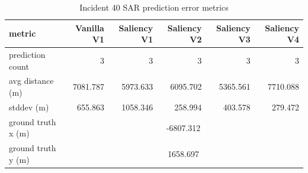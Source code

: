 \begin{table}[ht]
\centering
\caption{Incident 40 SAR prediction error metrics}
\label{tab:sar-incident-40}
\begin{tabular}{lrrrrr}
\hline
metric & Vanilla V1 & Saliency V1 & Saliency V2 & Saliency V3 & Saliency V4 \\
\hline
prediction count & 3 & 3 & 3 & 3 & 3 \\
avg distance (m) & 7081.787 & 5973.633 & 6095.702 & 5365.561 & 7710.088 \\
stddev (m) & 655.863 & 1058.346 & 258.994 & 403.578 & 279.472 \\
ground truth x (m) & \multicolumn{5}{c}{-6807.312} \\
ground truth y (m) & \multicolumn{5}{c}{1658.697} \\
\hline
\end{tabular}
\end{table}

